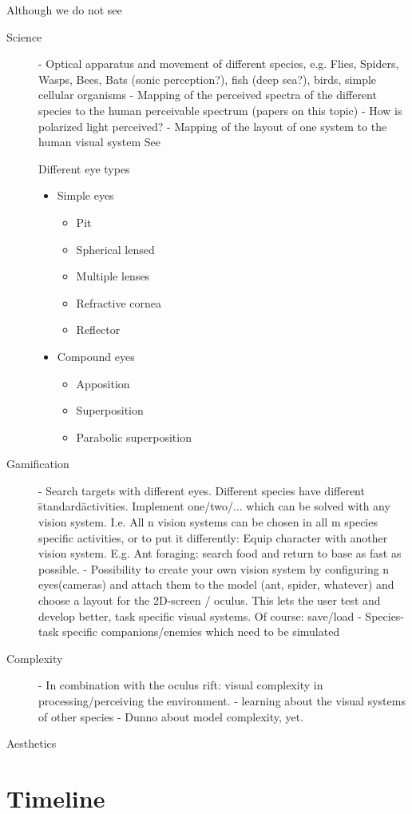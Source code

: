 \documentclass{acm_proc_article-sp}
\begin{document}
Although we do not see
\begin{description}
\item[Science]
- Optical apparatus and movement of different species, e.g.
    Flies, Spiders, Wasps, Bees, Bats (sonic perception?),
    fish (deep sea?), birds, simple cellular organisms
- Mapping of the perceived spectra of the different species to the human
  perceivable spectrum (papers on this topic)
- How is polarized light perceived?
- Mapping of the layout of one system to the human visual system
See \cite{insectvision}

Different eye types
\begin{itemize}
  \item Simple eyes
  \begin{itemize}
    \item Pit
    \item Spherical lensed
    \item Multiple lenses
    \item Refractive cornea
    \item Reflector
  \end{itemize}
  \item Compound eyes
  \begin{itemize}
    \item Apposition
    \item Superposition
    \item Parabolic superposition
  \end{itemize}
\end{itemize}

\item[Gamification]
- Search targets with different eyes. Different species have different
  \"standard\" activities.
  Implement one/two/... which can be solved with any vision system.
  I.e. All n vision systems can be chosen in all m species specific activities,
  or to put it differently: Equip character with another vision system.
  E.g. Ant foraging: search food and return to base as fast as possible.
- Possibility to create your own vision system by configuring n eyes(cameras)
  and attach them to the model (ant, spider, whatever) and choose a layout
  for the 2D-screen / oculus.
  This lets the user test and develop better, task specific visual systems.
  Of course: save/load
- Species-task specific companions/enemies which need to be simulated

\item[Complexity]
- In combination with the oculus rift: visual complexity in
  processing/perceiving the environment.
- learning about the visual systems of other species
- Dunno about model complexity, yet.

\item[Aesthetics]
\end{description}

\section{Timeline}

\printbibliography
\end{document}
